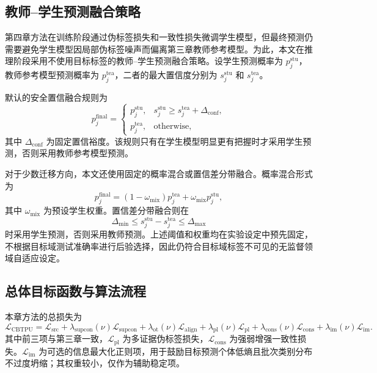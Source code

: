 \documentclass{seuthesis-2022}
\begin{document}
\subsection{教师--学生预测融合策略}

第四章方法在训练阶段通过伪标签损失和一致性损失微调学生模型，但最终预测仍需要避免学生模型因局部伪标签噪声而偏离第三章教师参考模型。为此，本文在推理阶段采用不使用目标标签的教师--学生预测融合策略。设学生预测概率为 $p_j^{\mathrm{stu}}$，教师参考模型预测概率为 $p_j^{\mathrm{tea}}$，二者的最大置信度分别为 $s_j^{\mathrm{stu}}$ 和 $s_j^{\mathrm{tea}}$。

默认的安全置信融合规则为
\begin{equation}
    p_j^{\mathrm{final}}
    =
    \begin{cases}
        p_j^{\mathrm{stu}},
        & s_j^{\mathrm{stu}}\geq s_j^{\mathrm{tea}}+\Delta_{\mathrm{conf}},\\
        p_j^{\mathrm{tea}},
        & \mathrm{otherwise},
    \end{cases}
\end{equation}
其中 $\Delta_{\mathrm{conf}}$ 为固定置信裕度。该规则只有在学生模型明显更有把握时才采用学生预测，否则采用教师参考模型预测。

对于少数迁移方向，本文还使用固定的概率混合或置信差分带融合。概率混合形式为
\begin{equation}
    p_j^{\mathrm{final}}
    =
    (1-\omega_{\mathrm{mix}})p_j^{\mathrm{tea}}
    +
    \omega_{\mathrm{mix}}p_j^{\mathrm{stu}},
\end{equation}
其中 $\omega_{\mathrm{mix}}$ 为预设学生权重。置信差分带融合则在
\begin{equation}
    \Delta_{\min}\leq s_j^{\mathrm{stu}}-s_j^{\mathrm{tea}}\leq \Delta_{\max}
\end{equation}
时采用学生预测，否则采用教师预测。上述阈值和权重均在实验设定中预先固定，不根据目标域测试准确率进行后验选择，因此仍符合目标域标签不可见的无监督领域自适应设定。

\subsection{总体目标函数与算法流程}

本章方法的总损失为
\begin{equation}
    \mathcal{L}_{\mathrm{CBTPU}}
    =
    \mathcal{L}_{\mathrm{src}}
    +
    \lambda_{\mathrm{supcon}}(\nu)\mathcal{L}_{\mathrm{supcon}}
    +
    \lambda_{\mathrm{ot}}(\nu)\mathcal{L}_{\mathrm{align}}
    +
    \lambda_{\mathrm{pl}}(\nu)\mathcal{L}_{\mathrm{pl}}
    +
    \lambda_{\mathrm{cons}}(\nu)\mathcal{L}_{\mathrm{cons}}
    +
    \lambda_{\mathrm{im}}(\nu)\mathcal{L}_{\mathrm{im}}.
\end{equation}
其中前三项与第三章一致，$\mathcal{L}_{\mathrm{pl}}$ 为多证据伪标签损失，$\mathcal{L}_{\mathrm{cons}}$ 为强弱增强一致性损失。$\mathcal{L}_{\mathrm{im}}$ 为可选的信息最大化正则项，用于鼓励目标预测个体低熵且批次类别分布不过度坍缩；其权重较小，仅作为辅助稳定项。
\end{document}
